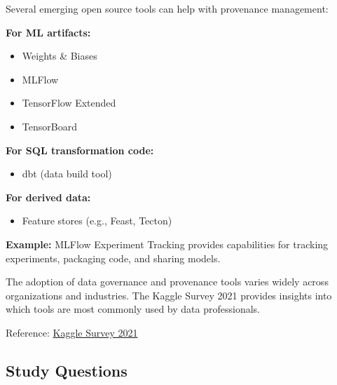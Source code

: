 \documentclass[12pt]{article}
\begin{document}
\begin{tcolorbox}[colback=green!5!white,colframe=green!75!black,title={Emerging Open Source Tools}]
Several emerging open source tools can help with provenance management:

\textbf{For ML artifacts:}
\begin{itemize}
    \item Weights \& Biases
    \item MLFlow
    \item TensorFlow Extended
    \item TensorBoard
\end{itemize}

\textbf{For SQL transformation code:}
\begin{itemize}
    \item dbt (data build tool)
\end{itemize}

\textbf{For derived data:}
\begin{itemize}
    \item Feature stores (e.g., Feast, Tecton)
\end{itemize}

\textbf{Example:} MLFlow Experiment Tracking provides capabilities for tracking experiments, packaging code, and sharing models.
\end{tcolorbox}

\begin{tcolorbox}[colback=blue!5!white,colframe=blue!75!black,title={Tool Adoption in Practice}]
The adoption of data governance and provenance tools varies widely across organizations and industries. The Kaggle Survey 2021 provides insights into which tools are most commonly used by data professionals.

Reference: \href{https://www.kaggle.com/kaggle-survey-2021}{Kaggle Survey 2021}
\end{tcolorbox}

\subsection{Study Questions}
\end{document}

